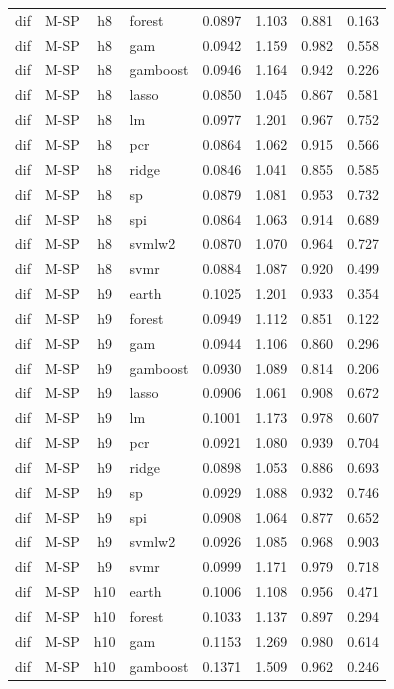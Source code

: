 \begin{ThreePartTable}
\begin{longtable}[t]{llclcccc}
dif & M-SP & h8 & forest & 0.0897 & 1.103 & 0.881 & 0.163\\
dif & M-SP & h8 & gam & 0.0942 & 1.159 & 0.982 & 0.558\\
dif & M-SP & h8 & gamboost & 0.0946 & 1.164 & 0.942 & 0.226\\
dif & M-SP & h8 & lasso & 0.0850 & 1.045 & 0.867 & 0.581\\
dif & M-SP & h8 & lm & 0.0977 & 1.201 & 0.967 & 0.752\\
dif & M-SP & h8 & pcr & 0.0864 & 1.062 & 0.915 & 0.566\\
dif & M-SP & h8 & ridge & 0.0846 & 1.041 & 0.855 & 0.585\\
dif & M-SP & h8 & sp & 0.0879 & 1.081 & 0.953 & 0.732\\
dif & M-SP & h8 & spi & 0.0864 & 1.063 & 0.914 & 0.689\\
dif & M-SP & h8 & svmlw2 & 0.0870 & 1.070 & 0.964 & 0.727\\
dif & M-SP & h8 & svmr & 0.0884 & 1.087 & 0.920 & 0.499\\
\addlinespace
dif & M-SP & h9 & earth & 0.1025 & 1.201 & 0.933 & 0.354\\
dif & M-SP & h9 & forest & 0.0949 & 1.112 & 0.851 & 0.122\\
dif & M-SP & h9 & gam & 0.0944 & 1.106 & 0.860 & 0.296\\
dif & M-SP & h9 & gamboost & 0.0930 & 1.089 & 0.814 & 0.206\\
dif & M-SP & h9 & lasso & 0.0906 & 1.061 & 0.908 & 0.672\\
dif & M-SP & h9 & lm & 0.1001 & 1.173 & 0.978 & 0.607\\
dif & M-SP & h9 & pcr & 0.0921 & 1.080 & 0.939 & 0.704\\
dif & M-SP & h9 & ridge & 0.0898 & 1.053 & 0.886 & 0.693\\
dif & M-SP & h9 & sp & 0.0929 & 1.088 & 0.932 & 0.746\\
dif & M-SP & h9 & spi & 0.0908 & 1.064 & 0.877 & 0.652\\
dif & M-SP & h9 & svmlw2 & 0.0926 & 1.085 & 0.968 & 0.903\\
dif & M-SP & h9 & svmr & 0.0999 & 1.171 & 0.979 & 0.718\\
\addlinespace
dif & M-SP & h10 & earth & 0.1006 & 1.108 & 0.956 & 0.471\\
dif & M-SP & h10 & forest & 0.1033 & 1.137 & 0.897 & 0.294\\
dif & M-SP & h10 & gam & 0.1153 & 1.269 & 0.980 & 0.614\\
dif & M-SP & h10 & gamboost & 0.1371 & 1.509 & 0.962 & 0.246\\

\end{longtable}
\end{ThreePartTable}
